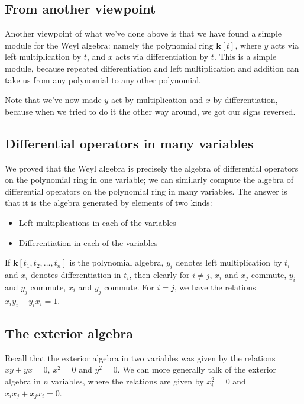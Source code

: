 \documentclass[a4paper]{amsart}
\newcommand{\field}{\mathbf{k}}
\begin{document}
\subsection{From another viewpoint}

Another viewpoint of what we've done above is that we have found a
simple module for the Weyl algebra: namely the polynomial ring
$\field[t]$, where $y$ acts via left multiplication by $t$, and $x$
acts via differentiation by $t$. This is a simple module, because
repeated differentiation and left multiplication and addition can take
us from any polynomial to any other polynomial.

Note that we've now made $y$ act by multiplication and $x$ by
differentiation, because when we tried to do it the other way around,
we got our signs reversed.

\subsection{Differential operators in many variables}

We proved that the Weyl algebra is precisely the algebra of
differential operators on the polynomial ring in one variable; we can
similarly compute the algebra of differential operators on the
polynomial ring in many variables. The answer is that it is the algebra
generated by elements of two kinds:

\begin{itemize}

\item Left multiplications in each of the variables

\item Differentiation in each of the variables

\end{itemize}

If $\field[t_1,t_2,\ldots,t_n]$ is the polynomial algebra, $y_i$
denotes left multiplication by $t_i$ and $x_i$ denotes differentiation
in $t_i$, then clearly for $i \ne j$, $x_i$ and $x_j$ commute, $y_i$
and $y_j$ commute, $x_i$ and $y_j$ commute. For $i = j$, we have the
relations $x_iy_i - y_ix_i = 1$.

\subsection{The exterior algebra}

Recall that the exterior algebra in two variables was given by the
relations $xy + yx = 0$, $x^2 = 0$ and $y^2 = 0$. We can more
generally talk of the exterior algebra in $n$ variables, where the
relations are given by $x_i^2 = 0$ and $x_ix_j + x_jx_i = 0$.
\end{document}
